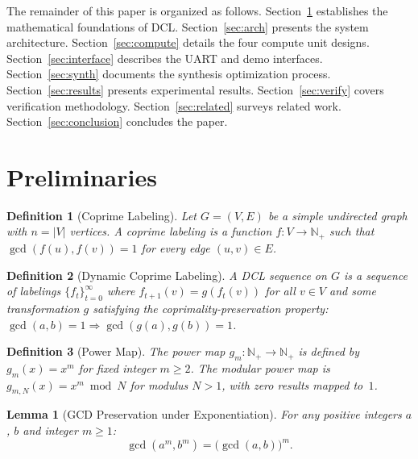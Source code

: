 \documentclass[lettersize,journal]{IEEEtran}
\newtheorem{lemma}[theorem]{Lemma}
\newtheorem{definition}{Definition}
\begin{document}
The remainder of this paper is organized as follows. Section~\ref{sec:prelim} establishes the mathematical foundations of DCL. Section~\ref{sec:arch} presents the system architecture. Section~\ref{sec:compute} details the four compute unit designs. Section~\ref{sec:interface} describes the UART and demo interfaces. Section~\ref{sec:synth} documents the synthesis optimization process. Section~\ref{sec:results} presents experimental results. Section~\ref{sec:verify} covers verification methodology. Section~\ref{sec:related} surveys related work. Section~\ref{sec:conclusion} concludes the paper.

\section{Preliminaries}
\label{sec:prelim}

\begin{definition}[Coprime Labeling]
Let $G = (V, E)$ be a simple undirected graph with $n = |V|$ vertices. A \emph{coprime labeling} is a function $f: V \to \mathbb{N}_+$ such that $\gcd(f(u), f(v)) = 1$ for every edge $(u,v) \in E$.
\end{definition}

\begin{definition}[Dynamic Coprime Labeling]
A \emph{DCL sequence} on $G$ is a sequence of labelings $\{f_t\}_{t=0}^{\infty}$ where $f_{t+1}(v) = g(f_t(v))$ for all $v \in V$ and some transformation $g$ satisfying the coprimality-preservation property: $\gcd(a,b) = 1 \Rightarrow \gcd(g(a), g(b)) = 1$.
\end{definition}

\begin{definition}[Power Map]
The \emph{power map} $g_m: \mathbb{N}_+ \to \mathbb{N}_+$ is defined by $g_m(x) = x^m$ for fixed integer $m \geq 2$. The \emph{modular power map} is $g_{m,N}(x) = x^m \bmod N$ for modulus $N > 1$, with zero results mapped to~$1$.
\end{definition}

\begin{lemma}[GCD Preservation under Exponentiation]
\label{lem:gcd}
For any positive integers $a$, $b$ and integer $m \geq 1$:
\begin{equation}
\gcd(a^m, b^m) = \bigl(\gcd(a, b)\bigr)^m.
\label{eq:gcd_preserve}
\end{equation}
\end{lemma}
\end{document}
